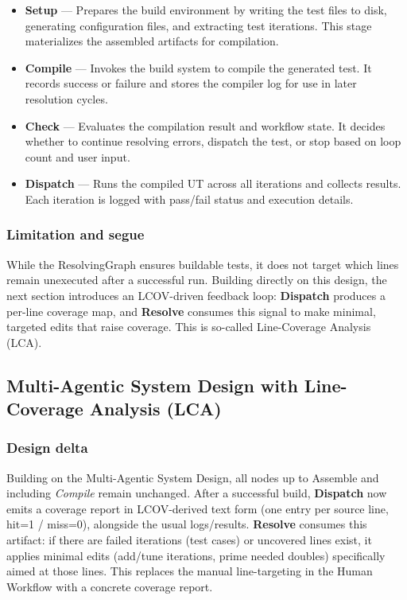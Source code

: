 \documentclass[conference]{IEEEtran}
\begin{document}
{\begin{itemize}
  \item \textbf{Setup} — Prepares the build environment by writing the test files to disk, generating configuration files, and extracting test iterations. This stage materializes the assembled artifacts for compilation.

  \item \textbf{Compile} — Invokes the build system to compile the generated test. It records success or failure and stores the compiler log for use in later resolution cycles.

  \item \textbf{Check} — Evaluates the compilation result and workflow state. It decides whether to continue resolving errors, dispatch the test, or stop based on loop count and user input.

  \item \textbf{Dispatch} — Runs the compiled UT across all iterations and collects results. Each iteration is logged with pass/fail status and execution details.
\end{itemize}
}

\subsubsection*{\textbf{Limitation and segue}}
While the ResolvingGraph ensures buildable tests, it does not target which lines remain unexecuted after a successful run. Building directly on this design, the next section introduces an LCOV-driven feedback loop: \textbf{Dispatch} produces a per-line coverage map, and \textbf{Resolve} consumes this signal to make minimal, targeted edits that raise coverage. This is so-called Line-Coverage Analysis (LCA).


\subsection{Multi-Agentic System Design with Line-Coverage Analysis (LCA)}
\subsubsection*{\textbf{Design delta}}
Building on the Multi-Agentic System Design, all nodes up to Assemble and including \textit{Compile} remain unchanged. After a successful build, \textbf{Dispatch} now emits a coverage report in LCOV-derived text form (one entry per source line, hit{=}1 / miss{=}0), alongside the usual logs/results. \textbf{Resolve} consumes this artifact: if there are failed iterations (test cases) or uncovered lines exist, it applies minimal edits (add/tune iterations, prime needed doubles) specifically aimed at those lines. This replaces the manual line-targeting in the Human Workflow with a concrete coverage report.
\end{document}
